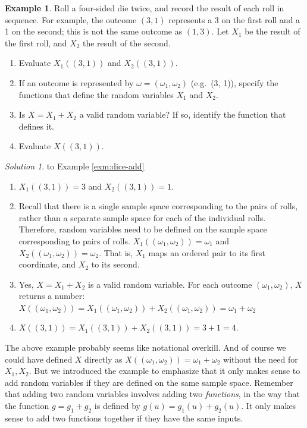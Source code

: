 \documentclass[
]{book}
\providecommand{\tightlist}{%
  \setlength{\itemsep}{0pt}\setlength{\parskip}{0pt}}
\theoremstyle{definition}
\theoremstyle{definition}
\newtheorem{example}{Example}[chapter]
\theoremstyle{definition}
\theoremstyle{remark}
\newtheorem*{solution}{Solution}
\begin{document}
\begin{example}
\protect\hypertarget{exm:dice-add}{}{\label{exm:dice-add} }Roll a four-sided die twice, and record the result of each roll in sequence. For example, the outcome \((3, 1)\) represents a 3 on the first roll and a 1 on the second; this is not the same outcome as \((1, 3)\). Let \(X_1\) be the result of the first roll, and \(X_2\) the result of the second.
\end{example}

\begin{enumerate}
\def\labelenumi{\arabic{enumi}.}
\tightlist
\item
  Evaluate \(X_1((3, 1))\) and \(X_2((3,1))\).
\item
  If an outcome is represented by \(\omega=(\omega_1, \omega_2)\) (e.g.~(3, 1)), specify the functions that define the random variables \(X_1\) and \(X_2\).
\item
  Is \(X=X_1 + X_2\) a valid random variable? If so, identify the function that defines it.
\item
  Evaluate \(X((3, 1))\).
\end{enumerate}

\begin{solution}
{}to Example \ref{exm:dice-add}
\end{solution}

\begin{enumerate}
\def\labelenumi{\arabic{enumi}.}
\tightlist
\item
  \(X_1((3, 1))=3\) and \(X_2((3,1))=1\).
\item
  Recall that there is a single sample space corresponding to the pairs of rolls, rather than a separate sample space for each of the individual rolls. Therefore, random variables need to be defined on the sample space corresponding to pairs of rolls. \(X_1((\omega_1, \omega_2))=\omega_1\) and \(X_2((\omega_1, \omega_2))=\omega_2\). That is, \(X_1\) maps an ordered pair to its first coordinate, and \(X_2\) to its second.
\item
  Yes, \(X=X_1 + X_2\) is a valid random variable. For each outcome \((\omega_1, \omega_2)\), \(X\) returns a number: \(X((\omega_1, \omega_2))=X_1((\omega_1, \omega_2)) + X_2((\omega_1, \omega_2))=\omega_1+\omega_2\)
\item
  \(X((3, 1)) = X_1((3, 1))+X_2((3,1))=3+1=4\).
\end{enumerate}

The above example probably seems like notational overkill. And of course we could have defined \(X\) directly as \(X((\omega_1,\omega_2))=\omega_1+\omega_2\) without the need for \(X_1, X_2\). But we introduced the example to emphasize that it only makes sense to add random variables if they are defined on the same sample space. Remember that adding two random variables involves adding two \emph{functions}, in the way that the function \(g = g_1 + g_2\) is defined by \(g(u) = g_1(u) + g_2(u)\). It only makes sense to add two functions together if they have the same inputs.
\end{document}
